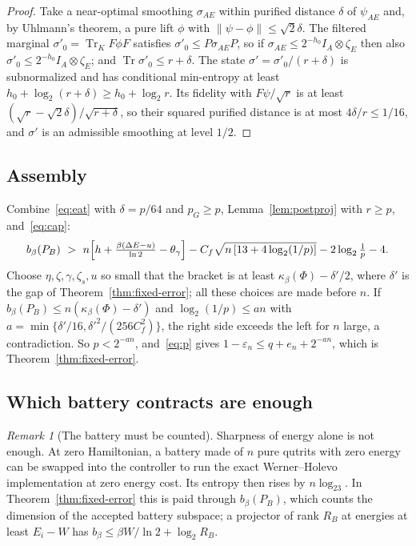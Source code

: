 \documentclass[11pt]{article}
\theoremstyle{definition}
\theoremstyle{remark}
\newtheorem{remark}{Remark}
\newcommand{\Tr}{\operatorname{Tr}}
\newcommand{\Trt}{\kappa_\beta}
\begin{document}
\begin{proof}
Take a near-optimal smoothing $\sigma_{AE}$ within purified distance $\delta$ of $\psi_{AE}$ and, by Uhlmann's theorem, a pure lift $\phi$ with $\|\psi-\phi\|\le\sqrt2\delta$. The filtered marginal $\sigma'_0=\Tr_KF\phi F$ satisfies $\sigma'_0\le P\sigma_{AE}P$, so if $\sigma_{AE}\le2^{-h_0}I_A\otimes\zeta_E$ then also $\sigma'_0\le2^{-h_0}I_A\otimes\zeta_E$; and $\Tr\sigma'_0\le r+\delta$. The state $\sigma'=\sigma'_0/(r+\delta)$ is subnormalized and has conditional min-entropy at least $h_0+\log_2(r+\delta)\ge h_0+\log_2r$. Its fidelity with $F\psi/\sqrt r$ is at least $(\sqrt r-\sqrt2\delta)/\sqrt{r+\delta}$, so their squared purified distance is at most $4\delta/r\le1/16$, and $\sigma'$ is an admissible smoothing at level $1/2$.
\end{proof}

\subsection{Assembly}

Combine~\eqref{eq:eat} with $\delta=p/64$ and $p_G\ge p$, Lemma~\ref{lem:postproj} with $r\ge p$, and~\eqref{eq:cap}:
\[
b_\beta(P_B)\ >\ n\Bigl[h+\tfrac{\beta(\Delta E-u)}{\ln2}-\theta_\gamma\Bigr]-C_f\sqrt{n\,[13+4\log_2(1/p)]}-2\log_2\tfrac1p-4.
\]
Choose $\eta,\zeta,\gamma,\zeta_s,u$ so small that the bracket is at least $\Trt(\Phi)-\delta'/2$, where $\delta'$ is the gap of Theorem~\ref{thm:fixed-error}; all these choices are made before $n$. If $b_\beta(P_B)\le n(\Trt(\Phi)-\delta')$ and $\log_2(1/p)\le an$ with $a=\min\{\delta'/16,\delta'^2/(256C_f^2)\}$, the right side exceeds the left for $n$ large, a contradiction. So $p<2^{-an}$, and~\eqref{eq:p} gives $1-\varepsilon_n\le q+e_n+2^{-an}$, which is Theorem~\ref{thm:fixed-error}.

\subsection{Which battery contracts are enough}

\begin{remark}[The battery must be counted]
Sharpness of energy alone is not enough. At zero Hamiltonian, a battery made of $n$ pure qutrits with zero energy can be swapped into the controller to run the exact Werner--Holevo implementation at zero energy cost. Its entropy then rises by $n\log_23$. In Theorem~\ref{thm:fixed-error} this is paid through $b_\beta(P_B)$, which counts the dimension of the accepted battery subspace; a projector of rank $R_B$ at energies at least $E_i-W$ has $b_\beta\le\beta W/\ln2+\log_2R_B$.
\end{remark}
\end{document}
